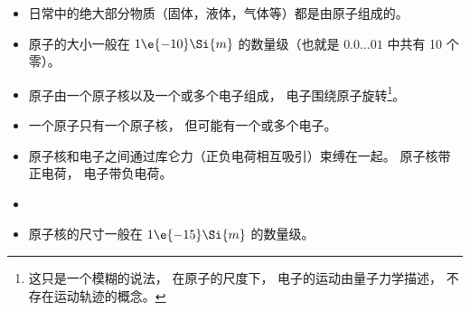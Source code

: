 
\begin{issues}
\issueDraft
\end{issues}

\begin{itemize}
\item 日常中的绝大部分物质（固体，液体，气体等）都是由原子组成的。
\item 原子的大小一般在 $1\e{-10}\Si{m}$ 的数量级（也就是 $0.0\dots01$ 中共有 10 个零）。
\item 原子由一个原子核以及一个或多个电子组成， 电子围绕原子旋转\footnote{这只是一个模糊的说法， 在原子的尺度下， 电子的运动由量子力学描述， 不存在运动轨迹的概念。}。

\item 一个原子只有一个原子核， 但可能有一个或多个电子。
\item 原子核和电子之间通过库仑力（正负电荷相互吸引）束缚在一起。 原子核带正电荷， 电子带负电荷。
\item 

\item 原子核的尺寸一般在 $1\e{-15}\Si{m}$ 的数量级。
\end{itemize}
